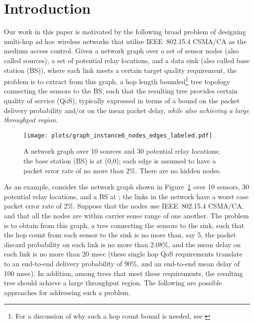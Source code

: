 \documentclass[12pt, draftclsnofoot, onecolumn]{IEEEtran}
\begin{document}
\section{Introduction}
\label{sec:intro}
Our work in this paper is motivated by the following broad problem of designing multi-hop ad hoc wireless networks that utilise IEEE~802.15.4 CSMA/CA as the medium access control. Given a network graph over a set of sensor nodes (also called sources), a set of potential relay locations, and a data sink (also called base station (BS)), where each link meets a certain target quality requirement, the problem is to extract from this graph, a hop length bounded\footnote{For a discussion of why such a hop count bound is needed, see \cite{bhattacharya-kumar14comnet,bhattacharya-kumar14tr-qos-aware-nw-design-csma}} tree topology connecting the sensors to the BS, such that the resulting tree provides certain quality of service (QoS), typically expressed in terms of a bound on the packet delivery probability and/or on the mean packet delay, \emph{while also achieving a large throughput region}.

\begin{figure}[t]
\footnotesize
\begin{center}
\texttt{[image: plots/graph\_instance6\_nodes\_edges\_labeled.pdf]}
\caption{A network graph over 10 sources and 30 potential relay locations; the base station (BS) is at (0,0); each edge is assumed to have a packet error rate of no more than 2\%. There are no hidden nodes.}
\label{fig:illustrative-topological-example}
\vspace{-5mm}
\end{center}
\normalsize
\end{figure}
As an example, consider the network graph shown in Figure~\ref{fig:illustrative-topological-example} over 10 sensors, 30 potential relay locations, and a BS at ; the links in the network have a worst case packet error rate of 2\%. Suppose that the nodes use IEEE~802.15.4 CSMA/CA, and that all the nodes are within carrier sense range of one another. The problem is to obtain from this graph, a tree connecting the sensors to the sink, such that the hop count from each sensor to the sink is no more than, say 5, the packet discard probability on each link is no more than 2.08\%, and the mean delay on each link is no more than 20 msec (these single hop QoS requirements translate to an end-to-end delivery probability of 90\%, and an end-to-end mean delay of 100 msec). In addition, among trees that meet these requirements, the resulting tree should achieve a large throughput region. The following are possible approaches for addressing such a problem. 
\end{document}
